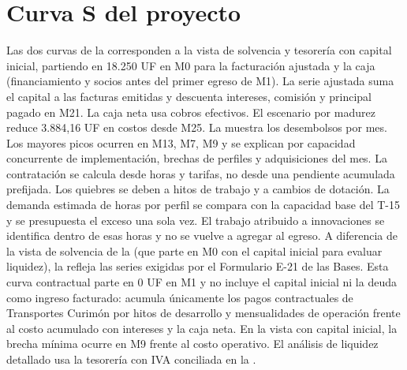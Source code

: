 \section{Curva S del proyecto}\label{sec:eco-curva-s}
Las dos curvas de la  corresponden a la vista de solvencia y tesorería con capital inicial, partiendo en 18.250 UF en M0 para la facturación ajustada y la caja (financiamiento y socios antes del primer egreso de M1). La serie ajustada suma el capital a las facturas emitidas y descuenta intereses, comisión y principal pagado en M21. La caja neta usa cobros efectivos. El escenario por madurez reduce 3.884,16 UF en costos desde M25.
La  muestra los desembolsos por mes. Los mayores picos ocurren en M13, M7, M9 y se explican por capacidad concurrente de implementación, brechas de perfiles y adquisiciones del mes. La contratación se calcula desde horas y tarifas, no desde una pendiente acumulada prefijada.
Los quiebres se deben a hitos de trabajo y a cambios de dotación. La demanda estimada de horas por perfil se compara con la capacidad base del T-15 y se presupuesta el exceso una sola vez. El trabajo atribuido a innovaciones se identifica dentro de esas horas y no se vuelve a agregar al egreso.
A diferencia de la vista de solvencia de la  (que parte en M0 con el capital inicial para evaluar liquidez), la  refleja las series exigidas por el Formulario E-21 de las Bases. Esta curva contractual parte en 0 UF en M1 y no incluye el capital inicial ni la deuda como ingreso facturado: acumula únicamente los pagos contractuales de Transportes Curimón por hitos de desarrollo y mensualidades de operación frente al costo acumulado con intereses y la caja neta. En la vista con capital inicial, la brecha mínima ocurre en M9 frente al costo operativo. El análisis de liquidez detallado usa la tesorería con IVA conciliada en la .

